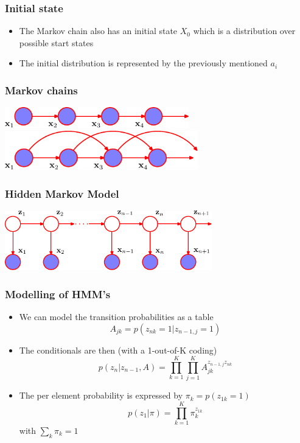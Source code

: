 \documentclass[10pt]{beamer}
\begin{document}
\begin{frame}
  \frametitle{Initial state}
  \begin{itemize}
  \item The Markov chain also has an initial state $X_0$ which is a
    distribution over possible start states
  \item The initial distribution is represented by the previously mentioned $a_i$
  \end{itemize}
\end{frame}


\begin{frame}
  \frametitle{Markov chains}
  \begin{center}
    \includegraphics[width=8cm]{prml-Figure13-3}\\[2cm]

    \includegraphics[width=8.4cm]{prml-Figure13-4}
  \end{center}
\end{frame}


\begin{frame}
  \frametitle{Hidden Markov Model}
  \begin{center}
    \includegraphics[width=9cm]{prml-Figure13-5}
  \end{center}
\end{frame}



\begin{frame}
  \frametitle{Modelling of HMM's}
  \begin{itemize}
  \item We can model the transition probabilities as a table
    \[
    A_{jk} = p(z_{nk} = 1 | z_{n-1,j} = 1)
    \]
  \item The conditionals are then (with a 1-out-of-K coding)
    \[
    p(z_n|z_{n-1},A) = \prod_{k=1}^K\prod_{j=1}^K A_{jk}^{z_{n-1,j} z_{nk}}
    \]
  \item The per element probability is expressed by $\pi_k =
    p(z_{1k}=1)$
    \[
    p(z_1 | \pi) = \prod_{k=1}^K \pi_k^{z_{1k}}
    \] with $\sum_k \pi_k = 1$
  \end{itemize}
\end{frame}
\end{document}
